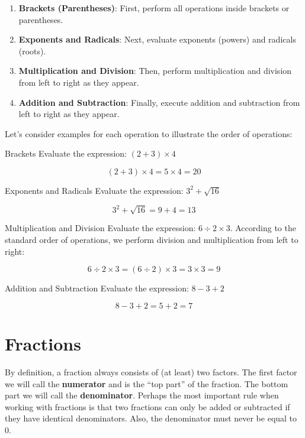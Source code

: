 \begin{enumerate}
    \item \textbf{Brackets (Parentheses)}: First, perform all operations inside brackets or parentheses.
    \item \textbf{Exponents and Radicals}: Next, evaluate exponents (powers) and radicals (roots).
    \item \textbf{Multiplication and Division}: Then, perform multiplication and division from left to right as they appear.
    \item \textbf{Addition and Subtraction}: Finally, execute addition and subtraction from left to right as they appear.
\end{enumerate}

Let's consider examples for each operation to illustrate the order of operations:

\newpage

\begin{example} Brackets \newline
Evaluate the expression: \((2 + 3) \times 4\)

\[
(2 + 3) \times 4 = 5 \times 4 = 20
\]
\end{example}

\begin{example} Exponents and Radicals \newline
Evaluate the expression: \(3^2 + \sqrt{16}\)

\[
3^2 + \sqrt{16} = 9 + 4 = 13
\]
\end{example}

\begin{example} Multiplication and Division \newline
Evaluate the expression: \(6 \div 2 \times 3\). According to the standard order of operations, we perform division and multiplication from left to right:

\[
6 \div 2 \times 3 = (6 \div 2) \times 3 = 3 \times 3 = 9
\]

\end{example}

\begin{example} Addition and Subtraction \newline
Evaluate the expression: \(8 - 3 + 2\)

\[
8 - 3 + 2 = 5 + 2 = 7
\]
\end{example}

\section{Fractions}
By definition, a fraction always consists of (at least) two factors. The first factor we will call the \textbf{numerator} and is the “top part” of the fraction. The bottom part we will call the \textbf{denominator}. Perhaps the most important rule when working with fractions is that two fractions can only be added or subtracted if they have identical denominators. Also, the denominator must never be equal to 0.

